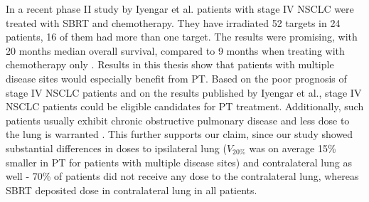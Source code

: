 



In a recent phase II study by Iyengar et al. \cite{Iyengar2014} patients with stage IV NSCLC were treated with SBRT and chemotherapy. 
They have irradiated 52 targets in 24 patients, 16 of them had more than one target. The results were promising, with 20 months median overall survival, 
compared to 9 months when treating with chemotherapy only \cite{Tsao2008}. Results in this thesis show that patients with multiple disease sites 
would especially benefit from PT. Based on the poor prognosis of stage IV NSCLC patients and on the results published by Iyengar et al.,
stage IV NSCLC patients could be eligible candidates for PT treatment. Additionally, such patients usually exhibit chronic obstructive pulmonary disease and 
less dose to the lung is warranted \cite{Westover2012}. This further supports our claim, since our study showed substantial differences in 
doses to ipsilateral lung ($V_{20\%}$ was on average 15\% smaller in PT for patients with multiple disease sites) and 
contralateral lung as well - 70\% of patients did not receive any dose to the contralateral lung, whereas SBRT deposited dose in contralateral lung in all patients.

